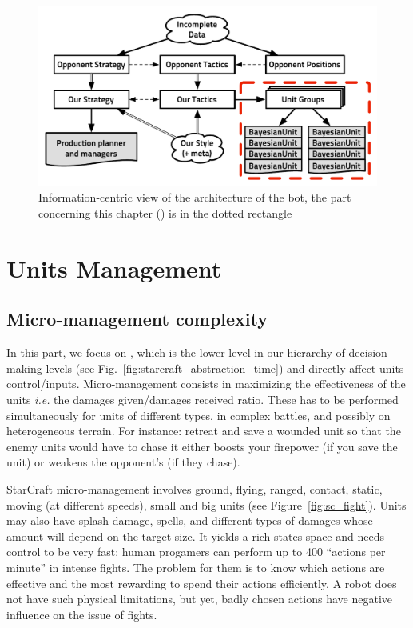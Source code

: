 
\begin{figure}[ht]
\begin{center}
\includegraphics[width=13cm]{images/starcraft_bbq_concept_MICRO.pdf}
\end{center}
\caption{Information-centric view of the architecture of the bot, the part concerning this chapter () is in the dotted rectangle}
\label{fig:conceptMICRO}
\end{figure}

\section{Units Management}
\subsection{Micro-management complexity}
In this part, we focus on , which is the lower-level in our hierarchy of decision-making levels (see Fig.~\ref{fig:starcraft_abstraction_time}) and directly affect units control/inputs. Micro-management consists in maximizing the effectiveness of the units \textit{i.e.} the damages given/damages received ratio. These has to be performed simultaneously for units of different types, in complex battles, and possibly on heterogeneous terrain. 
For instance: retreat and save a wounded unit so that the enemy units would have to chase it either boosts your firepower (if you save the unit) or weakens the opponent's (if they chase). 

StarCraft micro-management involves ground, flying, ranged, contact, static, moving (at different speeds), small and big units (see Figure~\ref{fig:sc_fight}). Units may also have splash damage, spells, and different types of damages whose amount will depend on the target size. It yields a rich states space and needs control to be very fast: human progamers can perform up to 400 ``actions per minute'' in intense fights. The problem for them is to know which actions are effective and the most rewarding to spend their actions efficiently. A robot does not have such physical limitations, but yet, badly chosen actions have negative influence on the issue of fights. %

